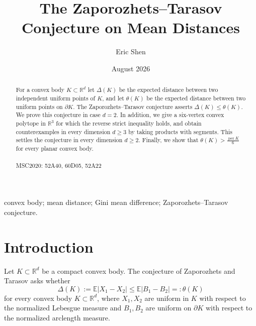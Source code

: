 \documentclass[final,12pt]{elsarticle}
\numberwithin{equation}{section}
\theoremstyle{remark}
\newcommand{\R}{\mathbb R}
\newcommand{\E}{\mathbb E}
\theoremstyle{definition}
\begin{document}
\begin{frontmatter}
\title{The Zaporozhets–Tarasov Conjecture on Mean Distances}
\author[eric]{Eric Shen}
\address[eric]{Moscow State University, Moscow, 119991, Russia \\
Institute for Numerical Mathematics, Russian Academy of Sciences, Russia}
\date{August 2026}

\begin{abstract}
For a convex body  $K\subset\R^d$  let $\Delta(K)$ be the expected distance between two independent uniform points of $K$, and let $\theta(K)$ be the expected distance between two uniform points on $\partial K$. The Zaporozhets–Tarasov conjecture asserts $\Delta(K) \le \theta(K)$. We prove this conjecture in case $d=2$. In addition, we give a six-vertex convex polytope in $\mathbb R^3$ for which the reverse strict inequality holds, and obtain counterexamples in every dimension $d \ge 3$ by taking products with segments. This settles the conjecture in every dimension $d \geq 2$. Finally, we show that
$\theta(K) > \frac{\operatorname{per}K}{6}$ for every planar convex body.
\\ \ \\
MSC2020: 52A40, 60D05, 52A22
\end{abstract}

\begin{keyword}
convex body; mean distance; Gini mean difference; Zaporozhets--Tarasov conjecture.
\end{keyword}
\end{frontmatter}

\section{Introduction}
Let $K \subset \mathbb{R}^d$ be a compact convex body. The conjecture of Zaporozhets and Tarasov asks whether
$$
\Delta(K):=\E|X_1-X_2|\leq \E|B_1-B_2|=: \theta(K)
$$
for every convex body $K\subset\R^d$, where $X_1,X_2$ are uniform in $K$ with respect to the normalized Lebesgue measure and $B_1,B_2$ are uniform on $\partial K$ with respect to the normalized arclength measure. 
\end{document}
